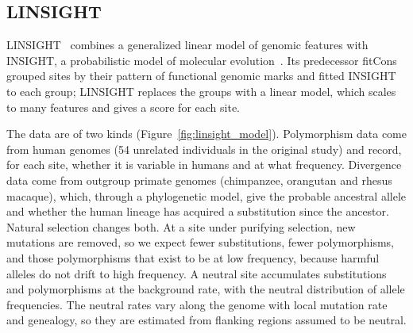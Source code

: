 \subsection{LINSIGHT}

LINSIGHT~\citep{huang2017} combines a generalized linear model of genomic features with INSIGHT, a probabilistic model of molecular evolution~\citep{gronau2013}. Its predecessor fitCons~\citep{gulko2015} grouped sites by their pattern of functional genomic marks and fitted INSIGHT to each group; LINSIGHT replaces the groups with a linear model, which scales to many features and gives a score for each site.

The data are of two kinds (Figure~\ref{fig:linsight_model}). Polymorphism data come from human genomes (54 unrelated individuals in the original study) and record, for each site, whether it is variable in humans and at what frequency. Divergence data come from outgroup primate genomes (chimpanzee, orangutan and rhesus macaque), which, through a phylogenetic model, give the probable ancestral allele and whether the human lineage has acquired a substitution since the ancestor. Natural selection changes both. At a site under purifying selection, new mutations are removed, so we expect fewer substitutions, fewer polymorphisms, and those polymorphisms that exist to be at low frequency, because harmful alleles do not drift to high frequency. A neutral site accumulates substitutions and polymorphisms at the background rate, with the neutral distribution of allele frequencies. The neutral rates vary along the genome with local mutation rate and genealogy, so they are estimated from flanking regions assumed to be neutral.

